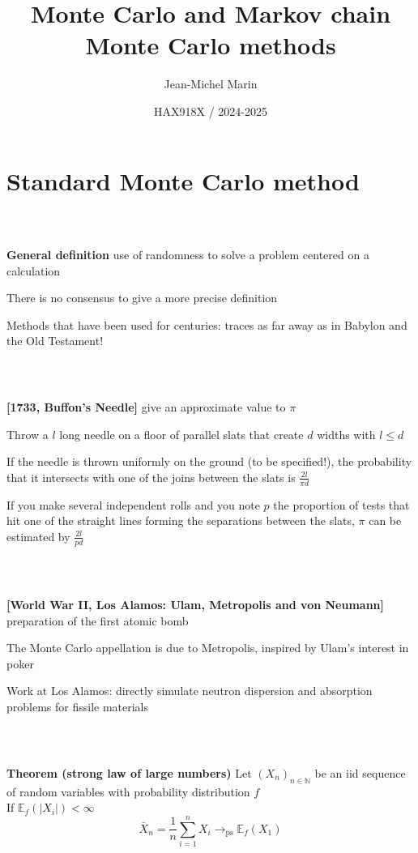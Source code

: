\documentclass[notes,professionalfont,11pt,usenames,dvipsnames]{beamer}
\title[MC and MCMC]{Monte Carlo and Markov chain Monte Carlo methods}
\author[Jean-Michel Marin]{Jean-Michel Marin}
\institute[IMAG]{University of Montpellier \\
Faculty of Sciences}
\date[HAX918X]{HAX918X / 2024-2025}
\newcommand{\E}{\mathbb{E}}
\newcommand\justify{\rightskip0pt \leftskip0pt}
\newenvironment{slide}
{\begin{frame}[environment=slide]
\frametitle{\insertsection \\ \insertsubsection}\justify\setlength{\parskip}{0.5cm}\vspace{-0.5cm}}
{\end{frame}}
\begin{document}
\frame{\titlepage}

\frame{\tableofcontents} 

\section{Standard Monte Carlo method}

\begin{slide}

{\bf General definition} use of randomness to solve 
a problem centered on a calculation


There is no consensus to give a more precise definition


Methods that have been used for centuries: traces as far away as in 
Babylon and the Old Testament!

\end{slide}

\begin{slide}

\textbf{[1733, Buffon's Needle]} give an approximate value to $\pi$


Throw a $l$ long needle on a floor of parallel slats that create $d$ widths 
with $l\leq d$


If the needle is thrown uniformly on the ground (to be specified!), the probability that it 
intersects with one of the joins between the slats is $\displaystyle\frac{2l}{\pi d} $


If you make several independent rolls and you note $p$ the proportion of tests that hit 
one of the straight lines forming the separations between the slats, $\pi$ can be estimated by
$\displaystyle\frac{2l}{pd}$

\end{slide}

\begin{slide}

\textbf{[World War II, Los Alamos: Ulam, Metropolis and von Neumann]}
preparation of the first atomic bomb


The Monte Carlo appellation is due to Metropolis, inspired by Ulam's interest in poker


Work at Los Alamos: directly simulate neutron dispersion and absorption problems for fissile materials

\end{slide}

\begin{slide}

{\bf Theorem (strong law of large numbers)}
Let $(X_n)_{n\in\mathbb{N}}$ be an iid sequence of random variables with probability distribution $f$ \\
If $\E_f(|X_i|)<\infty$
$$
\bar X_n=\frac{1}{n}\sum_{i=1}^n X_i \longrightarrow_{\mbox{ps}} \E_f(X_1)
$$

\end{slide}
\end{document}

